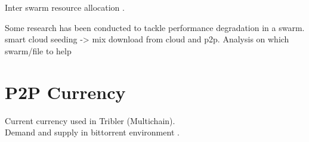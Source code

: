 Inter swarm resource allocation \cite{2011:interswarm:capota}.

Some research has been conducted to tackle performance degradation in a swarm.
smart cloud seeding -> mix download from cloud and p2p. Analysis on which swarm/file to help



\section{P2P Currency}
Current currency used in Tribler (Multichain)\cite{2015:multichain:norberhuis}.\\ Demand and supply in bittorrent environment \cite{2009:demandsupplyres:andrade}.